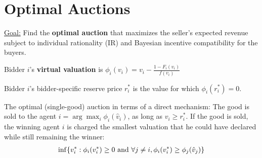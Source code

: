 \documentclass[11pt]{elegantbook}
\begin{document}
\section{Optimal Auctions}
\underline{Goal:} Find the \textbf{optimal auction} that maximizes the seller's expected revenue subject to individual rationality (IR) and Bayesian incentive compatibility for the buyers.


\begin{definition}
    \normalfont
    Bidder $i$'s \textbf{virtual valuation} is $\phi_i(v_i)=v_i-\frac{1-F_i(v_i)}{f(v_i)}$
\end{definition}

\begin{definition}
    \normalfont
    Bidder $i$'s bidder-specific reserve price $r_i^*$ is the value for which $\phi_i(r_i^*)=0$.
\end{definition}

\begin{theorem}[Myerson (1981)]
    The optimal (single-good) auction in terms of a direct mechanism: The good is sold to the agent $i=\arg\max_i\phi_i(\hat{v}_i)$, as long as $v_i\geq r_i^*$. If the good is sold, the winning agent $i$ is charged the smallest valuation that he could have declared while still remaining the winner:
    \begin{equation}
        \begin{aligned}
            \inf\{v_i^*:\phi_i(v_i^*)\geq 0 \textnormal{ and }\forall j\neq i, \phi_i(v_i^*)\geq \phi_j(\hat{v}_j)\}
        \end{aligned}
        \nonumber
    \end{equation}
\end{theorem}
\end{document}
